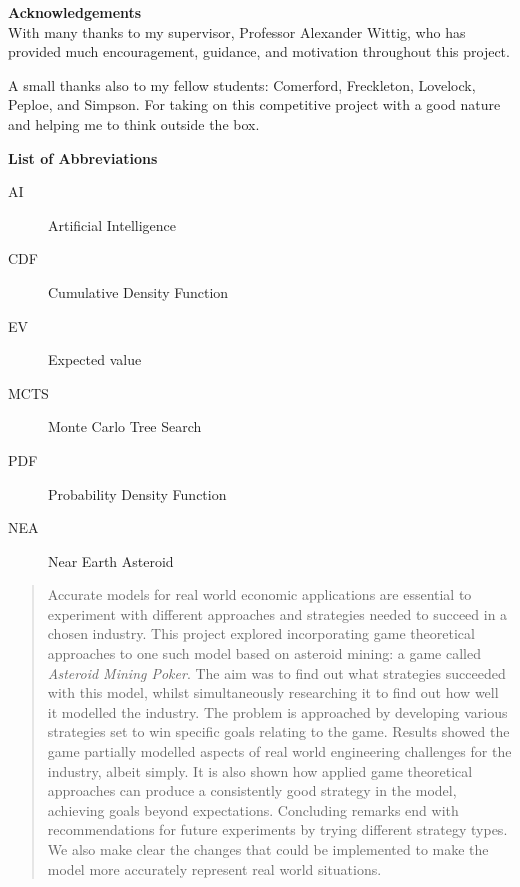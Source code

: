 \documentclass[11pt, twoside]{article}
\begin{document}
\newpage
{}
{}
{\huge\textbf{Acknowledgements}}\\[0.7cm]
With many thanks to my supervisor, Professor Alexander Wittig, who has provided much encouragement, guidance, and motivation throughout this project.

A small thanks also to my fellow students: Comerford, Freckleton, Lovelock, Peploe, and Simpson. For taking on this competitive project with a good nature and helping me to think outside the box.

\newpage
{}
{}
\tableofcontents
\pagebreak
\renewcommand{\thesection}{\arabic{section}}

\newpage
{}
{}
{\huge\textbf{List of Abbreviations}}\\
\begin{description}
	\item[AI] Artificial Intelligence
	\item[CDF] Cumulative Density Function
	\item[EV] Expected value
	\item[MCTS] Monte Carlo Tree Search
	\item[PDF] Probability Density Function
	\item[NEA] Near Earth Asteroid
\end{description}

\newpage
\vspace*{6.6cm}
\begin{abstract}
	Accurate models for real world economic applications are essential to experiment with different approaches and strategies needed to succeed in a chosen industry. This project explored incorporating game theoretical approaches to one such model based on asteroid mining: a game called \textit{Asteroid Mining Poker}. The aim was to find out what strategies succeeded with this model, whilst simultaneously researching it to find out how well it modelled the industry. The problem is approached by developing various strategies set to win specific goals relating to the game. Results showed the game partially modelled aspects of real world engineering challenges for the industry, albeit simply. It is also shown how applied game theoretical approaches can produce a consistently good strategy in the model, achieving goals beyond expectations. Concluding remarks end with recommendations for future experiments by trying different strategy types. We also make clear the changes that could be implemented to make the model more accurately represent real world situations.
	\thispagestyle{plain}
\end{abstract}
\end{document}
